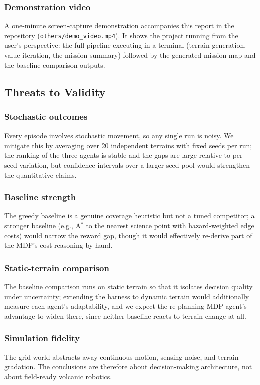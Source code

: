 \documentclass[conference]{IEEEtran}
\begin{document}
\subsubsection{Demonstration video} A one-minute screen-capture demonstration accompanies this report in the repository (\texttt{others/demo\_video.mp4}). It shows the project running from the user's perspective: the full pipeline executing in a terminal (terrain generation, value iteration, the mission summary) followed by the generated mission map and the baseline-comparison outputs.

\subsection{Threats to Validity}

\subsubsection{Stochastic outcomes} Every episode involves stochastic movement, so any single run is noisy. We mitigate this by averaging over 20 independent terrains with fixed seeds per run; the ranking of the three agents is stable and the gaps are large relative to per-seed variation, but confidence intervals over a larger seed pool would strengthen the quantitative claims.

\subsubsection{Baseline strength} The greedy baseline is a genuine coverage heuristic but not a tuned competitor; a stronger baseline (e.g., A$^{*}$ to the nearest science point with hazard-weighted edge costs) would narrow the reward gap, though it would effectively re-derive part of the MDP's cost reasoning by hand.

\subsubsection{Static-terrain comparison} The baseline comparison runs on static terrain so that it isolates decision quality under uncertainty; extending the harness to dynamic terrain would additionally measure each agent's adaptability, and we expect the re-planning MDP agent's advantage to widen there, since neither baseline reacts to terrain change at all.

\subsubsection{Simulation fidelity} The grid world abstracts away continuous motion, sensing noise, and terrain gradation. The conclusions are therefore about decision-making architecture, not about field-ready volcanic robotics.
\end{document}
